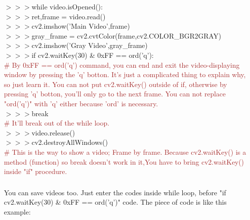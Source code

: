 \documentclass[a4paper,18pt]{article}
\begin{document}
{{{{{\hspace*{14pt}$>>>$while video.isOpened():\\
\hspace*{14pt}$>>>$\hspace*{28pt}ret,frame = video.read()\\
\hspace*{14pt}$>>>$\hspace*{28pt}cv2.imshow('Main Video',frame)\\
\hspace*{14pt}$>>>$\hspace*{28pt}gray\_frame = cv2.cvtColor(frame,cv2.COLOR\_BGR2GRAY)\\
\hspace*{14pt}$>>>$\hspace*{28pt}cv2.imshow('Gray Video',gray\_frame)\\
\hspace*{14pt}$>>>$\hspace*{28pt}if cv2.waitKey(30) \& 0xFF == ord('q'):\\{\textcolor{brown}{\# By 0xFF == ord('q') command, you can end and exit the video-displaying window by pressing the 'q' botton. It's just a complicated thing to explain why, so just learn it. You can not put cv2.waitKey() outside of if, otherwise by pressing 'q' botton, you'll only go to the next frame. You can not replace "ord('q')" with 'q' either because 'ord' is necessary.}}\\
\hspace*{14pt}$>>>$\hspace*{42pt}break\\{\textcolor{brown}{\# It'll break out of the while loop.}}\\
\hspace*{14pt}$>>>$video.release()\\
\hspace*{14pt}$>>>$cv2.destroyAllWindows()\\{\textcolor{brown}{\# This is the way to show a video; Frame by frame. Because cv2.waitKey() is a method (function) so break doesn't work in it,You have to bring cv2.waitKey() inside "if" procedure. }}\\


\subsubsection{\colorbox {important}{\color{white}{\large How to save desired frames}}}
You can save videos too. Just enter the codes inside while loop, before "if cv2.waitKey(30) \& 0xFF == ord('q')" code. The piece of code is like this example:\\

}}}}}
\end{document}
